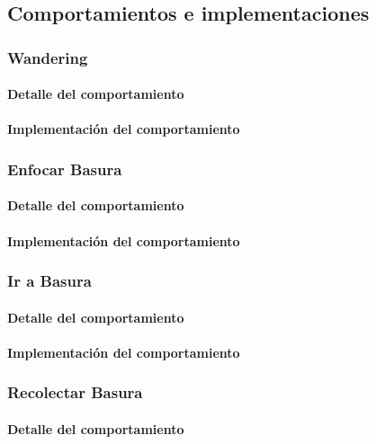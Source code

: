 
\subsection{Comportamientos e implementaciones}
\label{comportamientos}

\subsubsection{Wandering}
\label{wandering}
\paragraph{Detalle del comportamiento}
\paragraph{Implementaci\'on del comportamiento}

\subsubsection{Enfocar Basura}
\label{focus_garbage}
\paragraph{Detalle del comportamiento}
\paragraph{Implementaci\'on del comportamiento}

\subsubsection{Ir a Basura}
\label{go_to_garbage}
\paragraph{Detalle del comportamiento}
\paragraph{Implementaci\'on del comportamiento}

\subsubsection{Recolectar Basura}
\label{collect_garbage}
\paragraph{Detalle del comportamiento}
